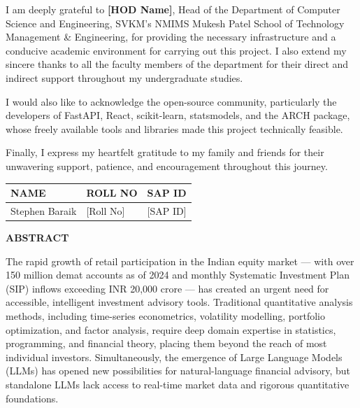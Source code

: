 \documentclass[12pt, a4paper, oneside]{report}
\begin{document}
\vspace{0.6cm}
\noindent
I am deeply grateful to \textbf{[HOD Name]}, Head of the Department of Computer Science and Engineering, SVKM's NMIMS Mukesh Patel School of Technology Management \& Engineering, for providing the necessary infrastructure and a conducive academic environment for carrying out this project. I also extend my sincere thanks to all the faculty members of the department for their direct and indirect support throughout my undergraduate studies.

\vspace{0.6cm}
\noindent
I would also like to acknowledge the open-source community, particularly the developers of FastAPI, React, scikit-learn, statsmodels, and the ARCH package, whose freely available tools and libraries made this project technically feasible.

\vspace{0.6cm}
\noindent
Finally, I express my heartfelt gratitude to my family and friends for their unwavering support, patience, and encouragement throughout this journey.

\vspace{1.5cm}

\noindent
\begin{tabular}{|l|l|l|}
\hline
\textbf{NAME} & \textbf{ROLL NO} & \textbf{SAP ID} \\
\hline
Stephen Baraik & [Roll No] & [SAP ID] \\
\hline
\end{tabular}

\newpage
\begin{center}
{\LARGE \textbf{ABSTRACT}}\\[1.5cm]
\end{center}

The rapid growth of retail participation in the Indian equity market --- with over 150 million demat accounts as of 2024 and monthly Systematic Investment Plan (SIP) inflows exceeding INR 20,000 crore --- has created an urgent need for accessible, intelligent investment advisory tools. Traditional quantitative analysis methods, including time-series econometrics, volatility modelling, portfolio optimization, and factor analysis, require deep domain expertise in statistics, programming, and financial theory, placing them beyond the reach of most individual investors. Simultaneously, the emergence of Large Language Models (LLMs) has opened new possibilities for natural-language financial advisory, but standalone LLMs lack access to real-time market data and rigorous quantitative foundations.
\end{document}

